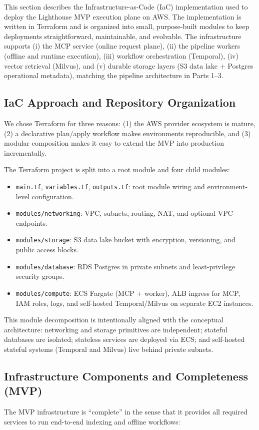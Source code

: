 \documentclass[a4paper,12pt]{article}
\begin{document}
This section describes the Infrastructure-as-Code (IaC) implementation used to deploy the Lighthouse MVP execution plane on AWS. The implementation is written in Terraform and is organized into small, purpose-built modules to keep deployments straightforward, maintainable, and evolvable. The infrastructure supports (i) the MCP service (online request plane), (ii) the pipeline workers (offline and runtime execution), (iii) workflow orchestration (Temporal), (iv) vector retrieval (Milvus), and (v) durable storage layers (S3 data lake + Postgres operational metadata), matching the pipeline architecture in Parts 1--3.

\subsection{IaC Approach and Repository Organization}
We chose Terraform for three reasons: (1) the AWS provider ecosystem is mature, (2) a declarative plan/apply workflow makes environments reproducible, and (3) modular composition makes it easy to extend the MVP into production incrementally.

The Terraform project is split into a root module and four child modules:

\begin{itemize}[leftmargin=*]
    \item \texttt{main.tf}, \texttt{variables.tf}, \texttt{outputs.tf}: root module wiring and environment-level configuration.
    \item \texttt{modules/networking}: VPC, subnets, routing, NAT, and optional VPC endpoints.
    \item \texttt{modules/storage}: S3 data lake bucket with encryption, versioning, and public access blocks.
    \item \texttt{modules/database}: RDS Postgres in private subnets and least-privilege security groups.
    \item \texttt{modules/compute}: ECS Fargate (MCP + worker), ALB ingress for MCP, IAM roles, logs, and self-hosted Temporal/Milvus on separate EC2 instances.
\end{itemize}

This module decomposition is intentionally aligned with the conceptual architecture: networking and storage primitives are independent; stateful databases are isolated; stateless services are deployed via ECS; and self-hosted stateful systems (Temporal and Milvus) live behind private subnets.

\subsection{Infrastructure Components and Completeness (MVP)}
The MVP infrastructure is ``complete'' in the sense that it provides all required services to run end-to-end indexing and offline workflows:
\end{document}
